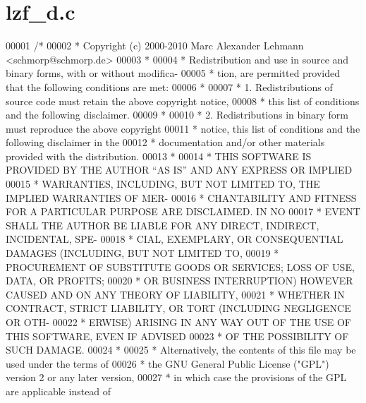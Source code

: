\hypertarget{lzf__d_8c_source}{}\section{lzf\+\_\+d.\+c}
\label{lzf__d_8c_source}

\begin{DoxyCode}
00001 \textcolor{comment}{/*}
00002 \textcolor{comment}{ * Copyright (c) 2000-2010 Marc Alexander Lehmann <schmorp@schmorp.de>}
00003 \textcolor{comment}{ *}
00004 \textcolor{comment}{ * Redistribution and use in source and binary forms, with or without modifica-}
00005 \textcolor{comment}{ * tion, are permitted provided that the following conditions are met:}
00006 \textcolor{comment}{ *}
00007 \textcolor{comment}{ *   1.  Redistributions of source code must retain the above copyright notice,}
00008 \textcolor{comment}{ *       this list of conditions and the following disclaimer.}
00009 \textcolor{comment}{ *}
00010 \textcolor{comment}{ *   2.  Redistributions in binary form must reproduce the above copyright}
00011 \textcolor{comment}{ *       notice, this list of conditions and the following disclaimer in the}
00012 \textcolor{comment}{ *       documentation and/or other materials provided with the distribution.}
00013 \textcolor{comment}{ *}
00014 \textcolor{comment}{ * THIS SOFTWARE IS PROVIDED BY THE AUTHOR ``AS IS'' AND ANY EXPRESS OR IMPLIED}
00015 \textcolor{comment}{ * WARRANTIES, INCLUDING, BUT NOT LIMITED TO, THE IMPLIED WARRANTIES OF MER-}
00016 \textcolor{comment}{ * CHANTABILITY AND FITNESS FOR A PARTICULAR PURPOSE ARE DISCLAIMED.  IN NO}
00017 \textcolor{comment}{ * EVENT SHALL THE AUTHOR BE LIABLE FOR ANY DIRECT, INDIRECT, INCIDENTAL, SPE-}
00018 \textcolor{comment}{ * CIAL, EXEMPLARY, OR CONSEQUENTIAL DAMAGES (INCLUDING, BUT NOT LIMITED TO,}
00019 \textcolor{comment}{ * PROCUREMENT OF SUBSTITUTE GOODS OR SERVICES; LOSS OF USE, DATA, OR PROFITS;}
00020 \textcolor{comment}{ * OR BUSINESS INTERRUPTION) HOWEVER CAUSED AND ON ANY THEORY OF LIABILITY,}
00021 \textcolor{comment}{ * WHETHER IN CONTRACT, STRICT LIABILITY, OR TORT (INCLUDING NEGLIGENCE OR OTH-}
00022 \textcolor{comment}{ * ERWISE) ARISING IN ANY WAY OUT OF THE USE OF THIS SOFTWARE, EVEN IF ADVISED}
00023 \textcolor{comment}{ * OF THE POSSIBILITY OF SUCH DAMAGE.}
00024 \textcolor{comment}{ *}
00025 \textcolor{comment}{ * Alternatively, the contents of this file may be used under the terms of}
00026 \textcolor{comment}{ * the GNU General Public License ("GPL") version 2 or any later version,}
00027 \textcolor{comment}{ * in which case the provisions of the GPL are applicable instead of}

\end{DoxyCode}
